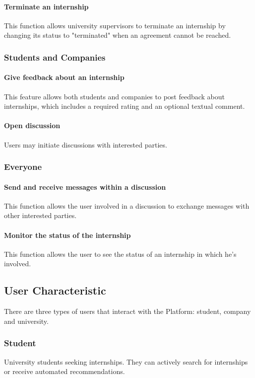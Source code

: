     \paragraph{Terminate an internship\\}
    This function allows university supervisors to terminate an internship by changing its status to "terminated" when an agreement cannot be reached.
\subsubsection{Students and Companies}
    \paragraph{Give feedback about an internship\\}
    This feature allows both students and companies to post feedback about internships, which includes a required rating and an optional textual comment.
    \paragraph{Open discussion\\}
    Users may initiate discussions with interested parties.
\subsubsection{Everyone}
    \paragraph{Send and receive messages within a discussion\\}
    This function allows the user involved in a discussion to exchange messages with other interested parties.
    \paragraph{Monitor the status of the internship\\}
    This function allows the user to see the status of an internship in which he’s involved.
\subsection{User Characteristic}
There are three types of users that interact with the Platform: student, company and university.
\subsubsection{Student}
University students seeking internships. They can actively search for internships or receive automated recommendations.
